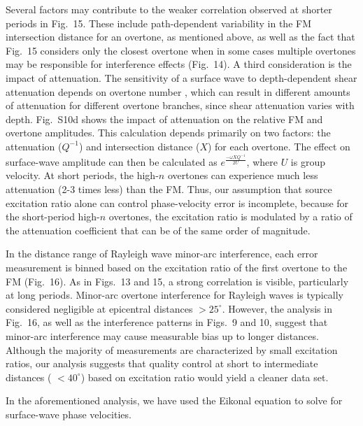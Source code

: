 \documentclass[extra,mreferee]{gji}
\begin{document}
Several factors may contribute to the weaker correlation observed at shorter periods in Fig.\ 15. These include path-dependent variability in the FM intersection distance for an overtone, as mentioned above, as well as the fact that Fig.\ 15 considers only the closest overtone when in some cases multiple overtones may be responsible for interference effects (Fig.\ 14). A third consideration is the impact of attenuation. The sensitivity of a surface wave to depth-dependent shear attenuation depends on overtone number \citep{dahlen1998theoretical}, which can result in different amounts of attenuation for different overtone branches, since shear attenuation varies with depth. Fig.\ S10d shows the impact of attenuation on the relative FM and overtone amplitudes. This calculation depends primarily on two factors: the attenuation ($Q^{-1}$) and intersection distance ($X$) for each overtone. The effect on surface-wave amplitude can then be calculated as $e^{\frac{-\omega X Q^{-1}}{2 U}}$, where $U$ is group velocity. At short periods, the high-$n$ overtones can experience much less attenuation (2-3 times less) than the FM. Thus, our assumption that source excitation ratio alone can control phase-velocity error is incomplete, because for the short-period high-$n$ overtones, the  excitation ratio is modulated by a ratio of the attenuation coefficient that can be of the same order of magnitude.

In the distance range of Rayleigh wave minor-arc interference, each error measurement is binned based on the excitation ratio of the first overtone to the FM (Fig.\ 16). As in Figs.\ 13 and 15, a strong correlation is visible, particularly at long periods. Minor-arc overtone interference for Rayleigh waves is typically considered negligible at epicentral distances $> 25^\circ$. However, the analysis in Fig.\ 16, as well as the interference patterns in Figs.\ 9 and 10, suggest that minor-arc interference may cause measurable bias up to longer distances. Although the majority of measurements are characterized by small excitation ratios, our analysis suggests that quality control at short to intermediate distances ( $ < 40^\circ$) based on excitation ratio would yield a cleaner data set. 

In the aforementioned analysis, we have used the Eikonal equation to solve for surface-wave phase velocities. 
\end{document}

